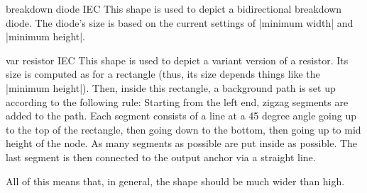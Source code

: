 \begin{shape}{breakdown diode IEC}
    This shape is used to depict a bidirectional breakdown diode. The diode's
    size is based on the current settings of |minimum width| and
    |minimum height|.
\begin{codeexample}[preamble={\usetikzlibrary{circuits.ee.IEC}}]
\end{codeexample}
\end{shape}

\begin{shape}{var resistor IEC}
    This shape is used to depict a variant version of a resistor. Its size is
    computed as for a rectangle (thus, its size depends things like the
    |minimum height|). Then, inside this rectangle, a background path is set up
    according to the following rule: Starting from the left end, zigzag
    segments are added to the path. Each segment consists of a line at a 45
    degree angle going up to the top of the rectangle, then going down to the
    bottom, then going up to mid height of the node. As many segments as
    possible are put inside as possible. The last segment is then connected to
    the output anchor via a straight line.

    All of this means that, in general, the shape should be much wider than
    high.
\begin{codeexample}[preamble={\usetikzlibrary{circuits.ee.IEC}}]
\end{codeexample}
\end{shape}

